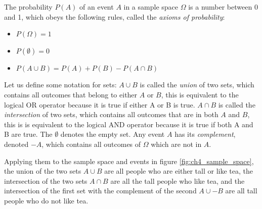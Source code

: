 \documentclass[
  letterpaper,
  DIV=11,
  numbers=noendperiod]{scrreprt}
\providecommand{\tightlist}{%
  \setlength{\itemsep}{0pt}\setlength{\parskip}{0pt}}\usepackage{longtable,booktabs,array}
\begin{document}
\begin{tcolorbox}[enhanced jigsaw, coltitle=black, arc=.35mm, opacitybacktitle=0.6, breakable, bottomtitle=1mm, toptitle=1mm, titlerule=0mm, colback=white, leftrule=.75mm, rightrule=.15mm, colframe=quarto-callout-note-color-frame, colbacktitle=quarto-callout-note-color!10!white, opacityback=0, title=\textcolor{quarto-callout-note-color}{\faInfo}\hspace{0.5em}{Definition}, left=2mm, toprule=.15mm, bottomrule=.15mm]

The probability \(P(A)\) of an event \(A\) in a sample space \(\Omega\)
is a number between 0 and 1, which obeys the following rules, called the
\emph{axioms of probability}:

\begin{itemize}
\tightlist
\item
  \(P(\Omega) = 1\)
\item
  \(P(\emptyset) = 0\)
\item
  \(P(A \cup B) = P(A) + P(B) - P(A \cap B)\)
\end{itemize}

\end{tcolorbox}

Let us define some notation for sets: \(A \cup B\) is called the
\emph{union} of two sets, which contains all outcomes that belong to
either \(A\) or \(B\), this is equivalent to the logical OR operator
because it is true if either A or B is true. \(A\cap B\) is called the
\emph{intersection} of two sets, which contains all outcomes that are in
both \(A\) and \(B\), this is is equivalent to the logical AND operator
because it is true if both A and B are true. The \(\emptyset\) denotes
the empty set. Any event \(A\) has its \emph{complement}, denoted
\(-A\), which contains all outcomes of \(\Omega\) which are not in
\(A\).

Applying them to the sample space and events in figure
\ref{fig:ch4_sample_space}, the union of the two sets \(A \cup B\) are
all people who are either tall or like tea, the intersection of the two
sets \(A\cap B\) are all the tall people who like tea, and the
intersection of the first set with the complement of the second
\(A \cup - B\) are all tall people who do not like tea.
\end{document}
